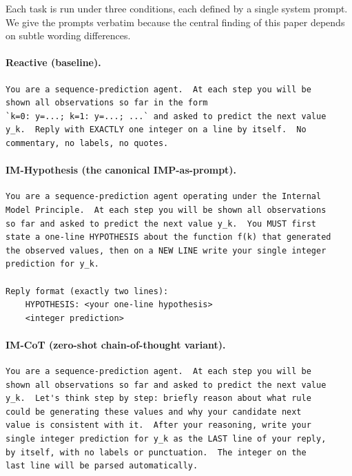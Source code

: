 \documentclass[11pt]{article}
\begin{document}
Each task is run under three conditions, each defined by a single
system prompt.  We give the prompts verbatim because the central
finding of this paper depends on subtle wording differences.

\paragraph{Reactive (baseline).}
\begin{Verbatim}[fontsize=\small,frame=single]
You are a sequence-prediction agent.  At each step you will be
shown all observations so far in the form
`k=0: y=...; k=1: y=...; ...` and asked to predict the next value
y_k.  Reply with EXACTLY one integer on a line by itself.  No
commentary, no labels, no quotes.
\end{Verbatim}

\paragraph{IM-Hypothesis (the canonical IMP-as-prompt).}
\begin{Verbatim}[fontsize=\small,frame=single]
You are a sequence-prediction agent operating under the Internal
Model Principle.  At each step you will be shown all observations
so far and asked to predict the next value y_k.  You MUST first
state a one-line HYPOTHESIS about the function f(k) that generated
the observed values, then on a NEW LINE write your single integer
prediction for y_k.

Reply format (exactly two lines):
    HYPOTHESIS: <your one-line hypothesis>
    <integer prediction>
\end{Verbatim}

\paragraph{IM-CoT (zero-shot chain-of-thought variant).}
\begin{Verbatim}[fontsize=\small,frame=single]
You are a sequence-prediction agent.  At each step you will be
shown all observations so far and asked to predict the next value
y_k.  Let's think step by step: briefly reason about what rule
could be generating these values and why your candidate next
value is consistent with it.  After your reasoning, write your
single integer prediction for y_k as the LAST line of your reply,
by itself, with no labels or punctuation.  The integer on the
last line will be parsed automatically.
\end{Verbatim}
\end{document}
